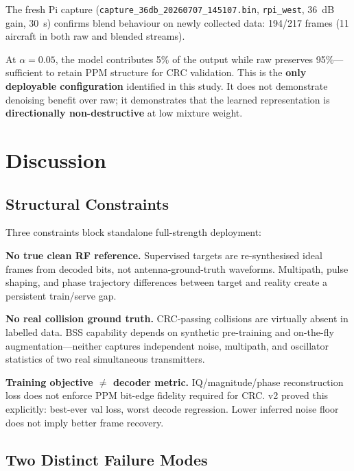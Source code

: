 \documentclass[11pt,a4paper]{article}
\begin{document}
The fresh Pi capture (\texttt{capture\_36db\_20260707\_145107.bin},
\texttt{rpi\_west}, 36~dB gain, 30~s) confirms blend behaviour on newly
collected data: 194/217 frames (11 aircraft in both raw and blended streams).

At $\alpha=0.05$, the model contributes 5\% of the output while raw preserves
95\%---sufficient to retain PPM structure for CRC validation. This is the
\textbf{only deployable configuration} identified in this study. It does not
demonstrate denoising benefit over raw; it demonstrates that the learned
representation is \textbf{directionally non-destructive} at low mixture weight.

\section{Discussion}
\label{sec:discussion}

\subsection{Structural Constraints}
\label{sec:constraints}

Three constraints block standalone full-strength deployment:

\textbf{No true clean RF reference.} Supervised targets are re-synthesised
ideal frames from decoded bits, not antenna-ground-truth waveforms. Multipath,
pulse shaping, and phase trajectory differences between target and reality
create a persistent train/serve gap.

\textbf{No real collision ground truth.} CRC-passing collisions are virtually
absent in labelled data. BSS capability depends on synthetic pre-training and
on-the-fly augmentation---neither captures independent noise, multipath, and
oscillator statistics of two real simultaneous transmitters.

\textbf{Training objective $\neq$ decoder metric.} IQ/magnitude/phase
reconstruction loss does not enforce PPM bit-edge fidelity required for CRC.
v2 proved this explicitly: best-ever val loss, worst decode regression. Lower
inferred noise floor does not imply better frame recovery.

\subsection{Two Distinct Failure Modes}
\end{document}
